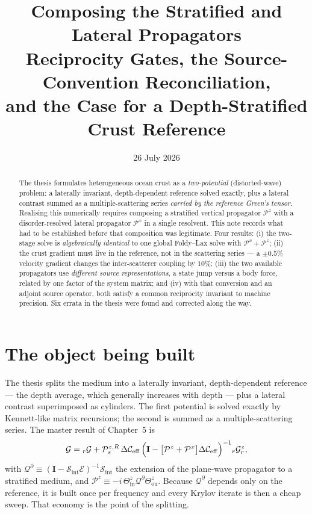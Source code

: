\documentclass[11pt,a4paper]{article}
\title{\bfseries Composing the Stratified and Lateral Propagators\\[4pt]
\large Reciprocity Gates, the Source-Convention Reconciliation,\\
and the Case for a Depth-Stratified Crust Reference}
\author{}
\date{26 July 2026}
\newcommand{\bI}{\mathbf{I}}
\newcommand{\Pz}{\mathcal{P}^{z}}
\newcommand{\Px}{\mathcal{P}^{x}}
\newcommand{\Qb}{\mathcal{Q}^{\partial}}
\newcommand{\dC}{\Delta\mathcal{C}_{\mathrm{eff}}}
\begin{document}
\maketitle

\begin{abstract}
\noindent
The thesis formulates heterogeneous ocean crust as a \emph{two-potential}
(distorted-wave) problem: a laterally invariant, depth-dependent reference
solved exactly, plus a lateral contrast summed as a multiple-scattering series
\emph{carried by the reference Green's tensor}.  Realising this numerically
requires composing a stratified vertical propagator $\Pz$ with a
disorder-resolved lateral propagator $\Px$ in a single resolvent.  This note
records what had to be established before that composition was legitimate.
Four results: (i) the two-stage solve is \emph{algebraically identical} to one
global Foldy--Lax solve with $\Px+\Pz$; (ii) the crust gradient must live in
the reference, not in the scattering series --- a $\pm0.5\%$ velocity gradient
changes the inter-scatterer coupling by $10\%$; (iii) the two available
propagators use \emph{different source representations}, a state jump versus a
body force, related by one factor of the system matrix; and (iv) with that
conversion and an adjoint source operator, both satisfy a common reciprocity
invariant to machine precision.  Six errata in the thesis were found and
corrected along the way.
\end{abstract}

\tableofcontents

\section{The object being built}

The thesis splits the medium into a laterally invariant, depth-dependent
reference --- the depth average, which generally increases with depth --- plus
a lateral contrast superimposed as cylinders.  The first potential is solved
exactly by Kennett-like matrix recursions; the second is summed as a
multiple-scattering series.  The master result of Chapter~5 is
\begin{equation}\label{eq:LSstrat}
  \mathcal{G} = {}_{r}\mathcal{G}
  + \mathcal{P}^{z,R}_{s}\,\dC\,
    \Bigl(\bI - \bigl[\Pz + \Px\bigr]\dC\Bigr)^{-1}
    {}_{r}\mathcal{G}^{z}_{r},
\end{equation}
with $\Qb \equiv (\bI - \mathcal{S}_{\mathrm{int}}\mathcal{E})^{-1}
\mathcal{S}_{\mathrm{int}}$ the extension of the plane-wave propagator to a
stratified medium, and $\Pz \equiv -i\,\Theta^{z}_{\mathrm{in}}\Qb
\Theta^{z}_{\mathrm{ou}}$.  Because $\Qb$ depends only on the reference, it is
built once per frequency and every Krylov iterate is then a cheap sweep.  That
economy is the point of the splitting.
\end{document}
